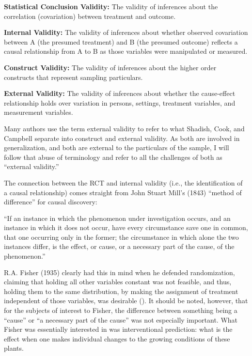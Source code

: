 \documentclass[a4paper,12pt]{article}
\begin{document}
\begin{displayquote}
\textbf{Statistical Conclusion Validity:} The validity of inferences about the correlation (covariation) between treatment and outcome.

\textbf{Internal Validity:} The validity of inferences about whether observed covariation between A (the presumed treatment) and B (the presumed outcome) reflects a causal relationship from A to B as those variables were manipulated or measured.

\textbf{Construct Validity:} The validity of inferences about the higher order constructs that represent sampling particulars.

\textbf{External Validity:} The validity of inferences about whether the cause-effect relationship holds over variation in persons, settings, treatment variables, and measurement variables.  
\end{displayquote}

Many authors use the term external validity to refer to what Shadish, Cook, and Campbell separate into construct and external validity. As both are involved in generalization, and both are external to the particulars of the sample, I will follow that abuse of terminology and refer to all the challenges of both as ``external validity.''

The connection between the RCT and internal validity (i.e., the identification of a causal relationship) comes straight from John Stuart Mill's (1843) ``method of difference'' for causal discovery:

\begin{displayquote}
  ``If an instance in which the phenomenon under investigation occurs, and an instance in which it does not occur, have every circumstance save one in common, that one occurring only in the former; the circumstance in which alone the two instances differ, is the effect, or cause, or a necessary part of the cause, of the phenomenon.''
\end{displayquote}

R.A. Fisher (1935) clearly had this in mind when he defended randomization, claiming that holding all other variables constant was not feasible, and thus, holding them to the same distribution, by making the assignment of treatment independent of those variables, was desirable (\cite{Rosenbaum2005}). It should be noted, however, that for the subjects of interest to Fisher, the difference between something being a ``cause'' or ``a necessary part of the cause'' was not especially important. What Fisher was essentially interested in was interventional prediction: what is the effect when one makes individual changes to the growing conditions of these plants. 
\end{document}
